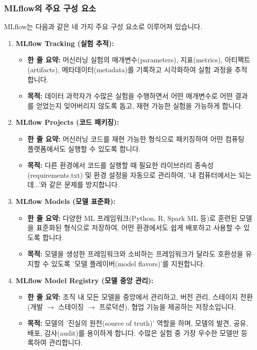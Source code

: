 \documentclass[11pt,a4paper]{article}
\begin{document}
\subsubsection*{MLflow의 주요 구성 요소}
MLflow는 다음과 같은 네 가지 주요 구성 요소로 이루어져 있습니다.
\begin{enumerate}
    \item \textbf{MLflow Tracking (실험 추적):}
    \begin{itemize}
        \item \textbf{한 줄 요약:} 머신러닝 실험의 매개변수(parameters), 지표(metrics), 아티팩트(artifacts), 메타데이터(metadata)를 기록하고 시각화하여 실험 과정을 추적합니다.
        \item \textbf{목적:} 데이터 과학자가 수많은 실험을 수행하면서 어떤 매개변수로 어떤 결과를 얻었는지 잊어버리지 않도록 돕고, 재현 가능한 실험을 가능하게 합니다.
    \end{itemize}
    \item \textbf{MLflow Projects (코드 패키징):}
    \begin{itemize}
        \item \textbf{한 줄 요약:} 머신러닝 코드를 재현 가능한 형식으로 패키징하여 어떤 컴퓨팅 플랫폼에서도 실행할 수 있도록 합니다.
        \item \textbf{목적:} 다른 환경에서 코드를 실행할 때 필요한 라이브러리 종속성(requirements.txt) 및 환경 설정을 자동으로 관리하여, '내 컴퓨터에서는 되는데...'와 같은 문제를 방지합니다.
    \end{itemize}
    \item \textbf{MLflow Models (모델 표준화):}
    \begin{itemize}
        \item \textbf{한 줄 요약:} 다양한 ML 프레임워크(Python, R, Spark ML 등)로 훈련된 모델을 표준화된 형식으로 저장하여, 어떤 환경에서도 쉽게 배포하고 사용할 수 있도록 합니다.
        \item \textbf{목적:} 모델을 생성한 프레임워크와 소비하는 프레임워크가 달라도 호환성을 유지할 수 있도록 '모델 플레이버(model flavors)'를 지원합니다.
    \end{itemize}
    \item \textbf{MLflow Model Registry (모델 중앙 관리):}
    \begin{itemize}
        \item \textbf{한 줄 요약:} 조직 내 모든 모델을 중앙에서 관리하고, 버전 관리, 스테이지 전환(개발 $\rightarrow$ 스테이징 $\rightarrow$ 프로덕션), 협업 기능을 제공하는 저장소입니다.
        \item \textbf{목적:} 모델의 '진실의 원천(source of truth)' 역할을 하며, 모델의 발견, 공유, 배포, 감사(audit)를 용이하게 합니다. 수많은 실험 중 가장 우수한 모델만 등록하여 관리합니다.
    \end{itemize}
\end{enumerate}
\end{document}
